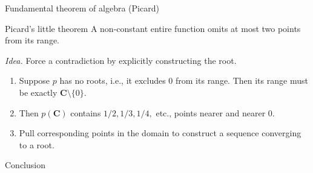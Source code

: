\documentclass{beamer}
\begin{document}
\begin{frame}[t]{Fundamental theorem of algebra (Picard)} \vspace{4pt}
\begin{block}{Picard's little theorem}
A non-constant entire function omits at most two points from its range.
\end{block}
\textit{Idea.} Force a contradiction by explicitly constructing the root.
\begin{enumerate}
	\item Suppose \(p\) has no roots, i.e., it excludes \(0\) from its range. Then its range must be exactly \(\mathbf{C} \setminus \{0\}\).
	\item Then \(p(\mathbf{C})\) contains \(1/2, 1/3, 1/4,\) etc., points nearer and nearer \(0\).
	\item Pull corresponding points in the domain to construct a sequence converging to a root.
\end{enumerate}
\end{frame}

\begin{frame}[standout]
\flushleft
Conclusion
\end{frame}
\end{document}
